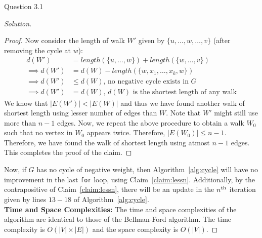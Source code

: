 \begin{solution}{Question 3.1}
\begin{proof}[Solution]
\begin{proof}
            Now consider the length of walk $W'$ given by $\{u, \ldots, w, \ldots, v\}$ (after removing the cycle at $w$):
            \begin{equation}
                \begin{split}
                    d(W') &= length(\{u, \ldots, w\}) + length(\{w, \ldots, v\})\\
                    \implies d(W') &= d(W) - length(\{w, x_1, \ldots, x_k, w\})\\
                    \implies d(W') &\leq d(W)\text{, no negative cycle exists in }G\\
                    \implies d(W') &= d(W)\text{, $d(W)$ is the shortest length of any walk}
                \end{split}
            \end{equation}
            We know that $|E(W')|<|E(W)|$ and thus we have found another walk of shortest length using lesser number of edges than $W$. Note that $W'$ might still use more than $n-1$ edges. Now, we repeat the above procedure to obtain a walk $W_0$ such that no vertex in $W_0$ appears twice. Therefore, $|E(W_0)|\leq n-1$. Therefore, we have found the walk of shortest length using atmost $n-1$ edges. This completes the proof of the claim.
        \end{proof}
        Now, if $G$ has no cycle of negative weight, then Algorithm~\ref{alg:cycle} will have no improvement in the last \texttt{for} loop, using Claim~\ref{claim:lessn}. Additionally, by the contrapositive of Claim~\ref{claim:lessn}, there will be an update in the $n\textsuperscript{th}$ iteration given by lines $13-18$ of Algorithm~\ref{alg:cycle}.\\

        \textbf{Time and Space Complexities:} The time and space complexities of the algorithm are identical to those of the Bellman-Ford algorithm. The time complexity is $O(|V|\times|E|)$ and the space complexity is $O(|V|)$.
    \end{proof}
\end{solution}
